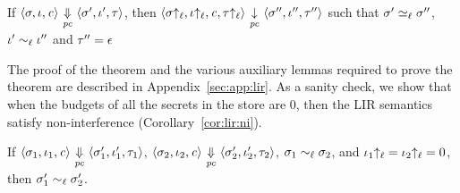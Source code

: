 \begin{myThm}
\label{thm:lir:csim}
If 
$\langle \sigma, \iota, \mathit{c} \rangle {~\underset{\mathit{pc}}{\Downarrow}~} \langle \sigma', \iota',
\tau \rangle$,  then 
$\langle \sigma{\uparrow_\ell}, \iota{\uparrow_\ell}, \mathit{c}, \tau{\uparrow_\ell}
\rangle  {~\underset{\mathit{pc}}{\downarrow}~} \langle \sigma'',\iota'',
\tau'' \rangle$ such that $\sigma' \simeq_\ell \sigma''$,
$\iota' \sim_\ell \iota''$ and $\tau'' = \epsilon$
\end{myThm}

The proof of the theorem and the various auxiliary lemmas 
required to prove the theorem are described in
Appendix~\ref{sec:app:lir}.  As a sanity check, we show that when the budgets of
all the secrets in the store are $0$, then the LIR semantics satisfy
non-interference (Corollary~\ref{cor:lir:ni}). 

\begin{mycor}
\label{cor:lir:ni}
If $\langle \sigma_1, \iota_1, \mathit{c} \rangle
{~\underset{\mathit{pc}}{\Downarrow}~} \langle \sigma_1', \iota_1', \tau_1 \rangle$, 
 $\langle \sigma_2, \iota_2, \mathit{c} \rangle
{~\underset{\mathit{pc}}{\Downarrow}~} \langle \sigma_2', \iota_2', \tau_2 \rangle$, 
 $\sigma_1 \sim_\ell \sigma_2$, and $\iota_1{\uparrow_\ell} = \iota_2{\uparrow_\ell} = 0$, 
then $\sigma_1' \sim_\ell \sigma_2'$.
\end{mycor}


